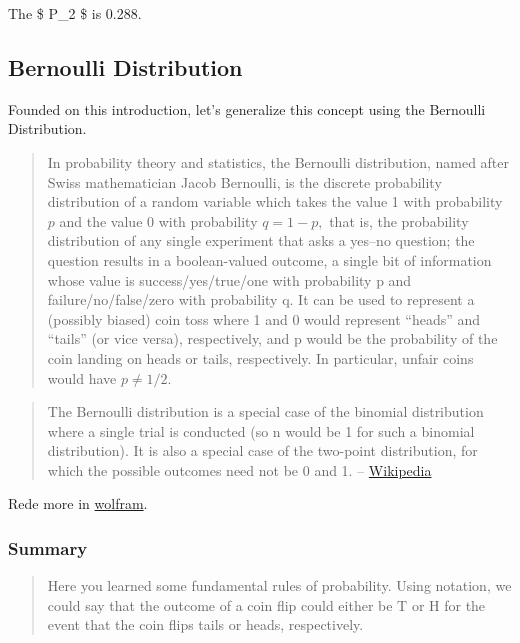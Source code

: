 \documentclass[]{book}
\begin{document}
The \$ P\_2 \$ is 0.288.

\subsection{Bernoulli Distribution}\label{bernoulli-distribution}

Founded on this introduction, let's generalize this concept using the
Bernoulli Distribution.

\begin{quote}
In probability theory and statistics, the Bernoulli distribution, named
after Swiss mathematician Jacob Bernoulli, is the discrete probability
distribution of a random variable which takes the value 1 with
probability \({\displaystyle p}\) and the value 0 with probability
\({\displaystyle q=1-p,}\) that is, the probability distribution of any
single experiment that asks a yes--no question; the question results in
a boolean-valued outcome, a single bit of information whose value is
success/yes/true/one with probability p and failure/no/false/zero with
probability q. It can be used to represent a (possibly biased) coin toss
where 1 and 0 would represent ``heads'' and ``tails'' (or vice versa),
respectively, and p would be the probability of the coin landing on
heads or tails, respectively. In particular, unfair coins would have
\({\displaystyle p\neq 1/2.}\)
\end{quote}

\begin{quote}
The Bernoulli distribution is a special case of the binomial
distribution where a single trial is conducted (so n would be 1 for such
a binomial distribution). It is also a special case of the two-point
distribution, for which the possible outcomes need not be 0 and 1. --
\href{https://en.wikipedia.org/wiki/Bernoulli_distribution}{Wikipedia}
\end{quote}

Rede more in
\href{http://mathworld.wolfram.com/BernoulliDistribution.html}{wolfram}.

\subsubsection{Summary}\label{summary}

\begin{quote}
Here you learned some fundamental rules of probability. Using notation,
we could say that the outcome of a coin flip could either be T or H for
the event that the coin flips tails or heads, respectively.
\end{quote}
\end{document}
